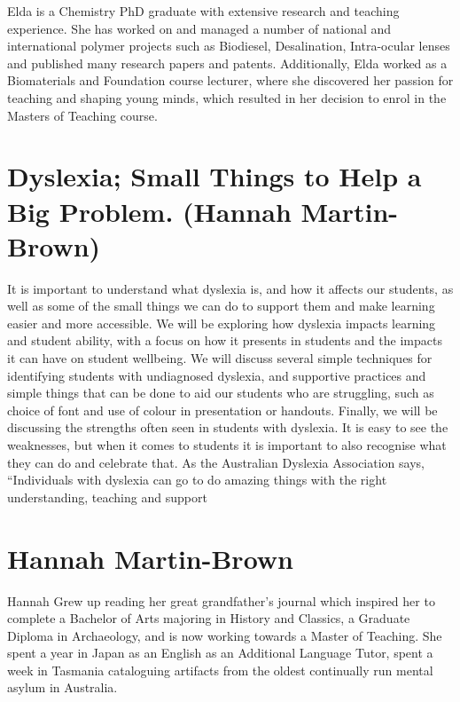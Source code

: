 \documentclass[twoside,12pt,a4paper,notitlepage]{memoir}
\begin{document}
Elda is a Chemistry PhD graduate with extensive research and teaching experience. She has worked on and managed a number of national and international polymer projects such as Biodiesel, Desalination, Intra-ocular lenses and published many research papers and patents. Additionally, Elda worked as a Biomaterials and Foundation course lecturer, where she discovered her passion for teaching and shaping young minds, which resulted in her decision to enrol in the Masters of Teaching course.



\pagebreak
\section*{Dyslexia; Small Things to Help a Big Problem. (Hannah Martin-Brown)}
\label{aut:brown}

It is important to understand what dyslexia is, and how it affects our students, as well as some of the small things we can do to support them and make learning easier and more accessible.
We will be exploring how dyslexia impacts learning and student ability, with a focus on how it presents in students and the impacts it can have on student wellbeing. We will discuss several simple techniques for identifying students with undiagnosed dyslexia, and supportive practices and simple things that can be done to aid our students who are struggling, such as choice of font and use of colour in presentation or handouts.
Finally, we will be discussing the strengths often seen in students with dyslexia. It is easy to see the weaknesses, but when it comes to students it is important to also recognise what they can do and celebrate that. As the Australian Dyslexia Association says, “Individuals with dyslexia can go to do amazing things with the right understanding, teaching and support

\section*{Hannah Martin-Brown}

Hannah Grew up reading her great grandfather’s journal which inspired her to complete a Bachelor of Arts majoring in History and Classics, a Graduate Diploma in Archaeology, and is now working towards a Master of Teaching. She spent a year in Japan as an English as an Additional Language Tutor, spent a week in Tasmania cataloguing artifacts from the oldest continually run mental asylum in Australia.
\end{document}
